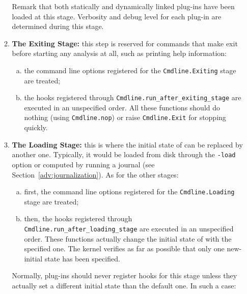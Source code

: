 \begin{enumerate}[A --]
\begin{enumerate}[1.]
  Remark that both statically and dynamically linked plug-ins have
  been loaded at this stage. Verbosity and debug level for each
  plug-in are determined during this stage.

\item \textbf{The Exiting Stage:} this step is reserved for commands
  that make \framac exit before starting any analysis at all, such as
  printing help information:
  \begin{enumerate}[(a)]

  \item the command line options registered for the
    \texttt{Cmdline.Exiting} stage
    are treated;

  \item the hooks registered through
    \texttt{Cmdline.run\_after\_exiting\_stage}
     are executed in
    an unspecified order. All these functions should do nothing (using
    \texttt{Cmdline.nop}) or raise
    \texttt{Cmdline.Exit} for stopping \framac
    quickly.

  \end{enumerate}

\item \textbf{The Loading Stage:} this is where the initial state of \framac
  can be replaced by another one. Typically, it would be loaded from disk
  through the \texttt{-load} option or computed by running a
  journal (see Section~\ref{adv:journalization}). As
  for the other stages:
  \begin{enumerate}[(a)]

  \item first, the command line options registered for the
    \texttt{Cmdline.Loading} stage
    are treated;

  \item then, the hooks registered through
    \texttt{Cmdline.run\_after\_loading\_stage}
     are executed in
    an unspecified order. These functions actually change the initial
    state of \framac with the specified one. The \framac kernel
    verifies as far as possible that only one new-initial state has
    been specified.
  \end{enumerate}

  Normally, plug-ins should never register hooks for this stage unless they
  actually set a different initial state than the default one. In such a case:


\end{enumerate}
\end{enumerate}
